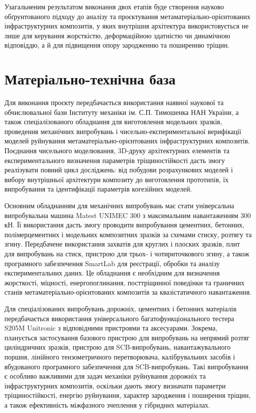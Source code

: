 \documentclass[12pt,a4paper]{article}
\begin{document}
Узагальненим результатом виконання двох етапів буде створення науково обґрунтованого підходу до аналізу та проєктування метаматеріально-орієнтованих інфраструктурних композитів, у яких внутрішня архітектура використовується не лише для керування жорсткістю, деформаційною здатністю чи динамічною відповіддю, а й для підвищення опору зародженню та поширенню тріщин.


\section{Матеріально-технічна база}

Для виконання проєкту передбачається використання наявної наукової та обчислювальної бази Інституту механіки ім. С.П. Тимошенка НАН України, а також спеціалізованого обладнання для виготовлення модельних зразків, проведення механічних випробувань і чисельно-експериментальної верифікації моделей руйнування метаматеріально-орієнтованих інфраструктурних композитів. Поєднання чисельного моделювання, 3D-друку архітектурних елементів та експериментального визначення параметрів тріщиностійкості дасть змогу реалізувати повний цикл досліджень: від побудови розрахункових моделей і вибору внутрішньої архітектури композиту до виготовлення прототипів, їх випробування та ідентифікації параметрів когезійних моделей.

Основним обладнанням для механічних випробувань має стати універсальна випробувальна машина Matest UNIMEC 300 з максимальним навантаженням 300 кН. Її використання дасть змогу проводити випробування цементних, бетонних, полімерцементних і модельних композитних зразків за схемами стиску, розтягу та згину. Передбачене використання захватів для круглих і плоских зразків, плит для випробувань на стиск, пристрою для трьох- і чотириточкового згину, а також програмного забезпечення SmartLab для реєстрації, обробки та аналізу експериментальних даних. Це обладнання є необхідним для визначення жорсткості, міцності, енергопоглинання, посттріщинної поведінки та граничних станів метаматеріально-орієнтованих композитів за квазістатичного навантаження.

Для спеціалізованих випробувань дорожніх, цементних і бетонних матеріалів передбачається використання універсального багатофункціонального тестера S205M Unitronic з відповідними пристроями та аксесуарами. Зокрема, планується застосування базового пристрою для випробувань на непрямий розтяг циліндричних зразків, пристрою для SCB-випробувань, навантажувального поршня, лінійного тензометричного перетворювача, калібрувальних засобів і вбудованого програмного забезпечення для SCB-випробувань. Такі випробування є особливо важливими для задач механіки руйнування дорожніх та інфраструктурних композитів, оскільки дають змогу визначати параметри тріщиностійкості, енергію руйнування, характер зародження і поширення тріщин, а також ефективність міжфазного зчеплення у гібридних матеріалах.
\end{document}
